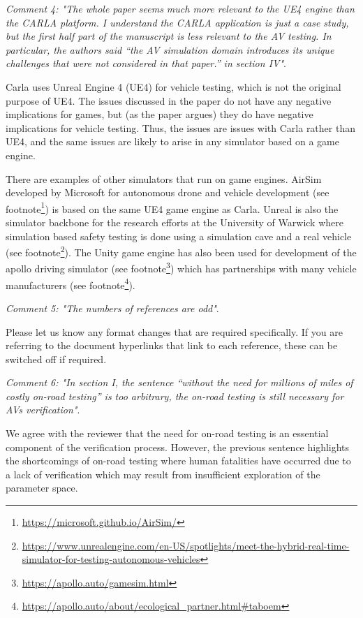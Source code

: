 \documentclass[11pt, a4paper]{letter} %
\begin{document}
\begin{letter}
\bigskip


\textit{Comment 4: "The whole paper seems much more relevant to the UE4 engine than the CARLA platform. I understand the CARLA application is just a case study, but the first half part of the manuscript is less relevant to the AV testing. In particular, the authors said “the AV simulation domain introduces its unique challenges that were not considered in that paper.” in section IV"}.

Carla uses Unreal Engine 4 (UE4) for vehicle testing, which is not the original purpose of UE4. The issues discussed in the paper do not have any negative implications for games, but (as the paper argues) they do have negative implications for vehicle testing. Thus, the issues are issues with Carla rather than UE4, and the same issues are likely to arise in any simulator based on a game engine.

There are examples of other simulators that run on game engines. AirSim developed by Microsoft for autonomous drone and vehicle development (see footnote\footnote{\url{https://microsoft.github.io/AirSim/}}) is based on the same UE4 game engine as Carla. Unreal is also the simulator backbone for the research efforts at the University of Warwick where simulation based safety testing is done using a simulation cave and a real vehicle (see footnote\footnote{\url{https://www.unrealengine.com/en-US/spotlights/meet-the-hybrid-real-time-simulator-for-testing-autonomous-vehicles}}). The Unity game engine has also been used for development of the apollo driving simulator (see footnote\footnote{\url{https://apollo.auto/gamesim.html}}) which has partnerships with many vehicle manufacturers (see footnote\footnote{\url{https://apollo.auto/about/ecological\_partner.html#taboem}}).


\bigskip


\textit{Comment 5: "The numbers of references are odd"}.

Please let us know any format changes that are required specifically. If you are referring to the document hyperlinks that link to each reference, these can be switched off if required.


\bigskip


\textit{Comment 6: "In section I, the sentence “without the need for millions of miles of costly on-road testing” is too arbitrary, the on-road testing is still necessary for AVs verification"}.

We agree with the reviewer that the need for on-road testing is an essential component of the verification process. However, the previous sentence highlights the shortcomings of on-road testing where human fatalities have occurred due to a lack of verification which may result from insufficient exploration of the parameter space.


\end{letter}
\end{document}
